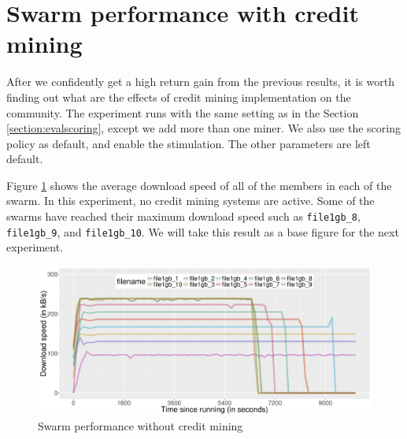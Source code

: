 \section{Swarm performance with credit mining}
\label{section:swperf}
After we confidently get a high return gain from the previous results, it is worth finding out what are the effects of credit mining implementation on the community. The experiment runs with the same setting as in the Section \ref{section:evalscoring}, except we add more than one miner. We also use the scoring policy as default, and enable the stimulation. The other parameters are left default. 

Figure \ref{fig:swarmnocmperf} shows the average download speed of all of the members in each of the swarm. In this experiment, no credit mining systems are active. Some of the swarms have reached their maximum download speed such as \texttt{file1gb\_8}, \texttt{file1gb\_9}, and \texttt{file1gb\_10}. We will take this result as a base figure for the next experiment.

\begin{figure}[h]
	\centering
	\includegraphics[width=\textwidth]{pics/results/swperf_n2.png}
	\caption{Swarm performance without credit mining}
	\label{fig:swarmnocmperf}
\end{figure}


